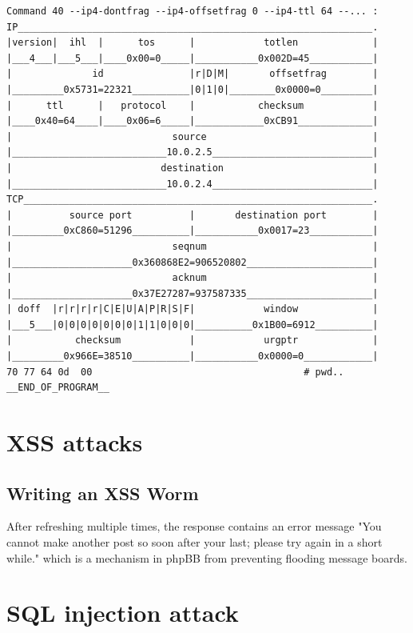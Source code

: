 \documentclass[12pt, a4paper, pdflatex]{article}
\begin{document}
\begin{verbatim}
Command 40 --ip4-dontfrag --ip4-offsetfrag 0 --ip4-ttl 64 --... :
IP______________________________________________________________.
|version|  ihl  |      tos      |            totlen             |
|___4___|___5___|____0x00=0_____|___________0x002D=45___________|
|              id               |r|D|M|       offsetfrag        |
|_________0x5731=22321__________|0|1|0|________0x0000=0_________|
|      ttl      |   protocol    |           checksum            |
|____0x40=64____|____0x06=6_____|____________0xCB91_____________|
|                            source                             |
|___________________________10.0.2.5____________________________|
|                          destination                          |
|___________________________10.0.2.4____________________________|
TCP_____________________________________________________________.
|          source port          |       destination port        |
|_________0xC860=51296__________|___________0x0017=23___________|
|                            seqnum                             |
|_____________________0x360868E2=906520802______________________|
|                            acknum                             |
|_____________________0x37E27287=937587335______________________|
| doff  |r|r|r|r|C|E|U|A|P|R|S|F|            window             |
|___5___|0|0|0|0|0|0|0|1|1|0|0|0|__________0x1B00=6912__________|
|           checksum            |            urgptr             |
|_________0x966E=38510__________|___________0x0000=0____________|
70 77 64 0d  00                                     # pwd..
__END_OF_PROGRAM__
\end{verbatim}

\section{XSS attacks}

\subsection{Writing an XSS Worm}

After refreshing multiple times, the response contains an error message "You cannot make another post so soon after your last; please try again in a short while." which is a mechanism in phpBB from preventing flooding message boards.


\section{SQL injection attack}
\end{document}
